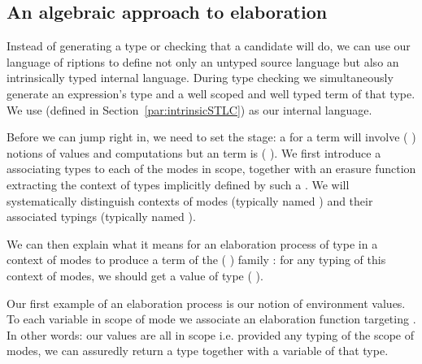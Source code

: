 \subsection{An algebraic approach to elaboration}\label{section:elaboration}

Instead of generating a type or checking that a candidate will do, we
can use our language of riptions to define not only an
untyped source language but also an intrinsically typed internal
language. During type checking we simultaneously generate an
expression's type and a well scoped and well typed term of that
type. We use  (defined in Section~\ref{par:intrinsicSTLC}) as
our internal language.

Before we can jump right in, we need to set the stage: a  for a
 term will involve ({ }) notions of values and
computations but an  term is ({ }). We first
introduce a  associating types to each of the modes in scope,
together with an erasure function  extracting the context of types
implicitly defined by such a .
We will systematically distinguish contexts of modes (typically named )
and their associated typings (typically named ).

\noindent
\begin{minipage}{\textwidth}
\begin{minipage}[t]{0.4\textwidth}
\end{minipage}
\begin{minipage}[t]{0.5\textwidth}
\end{minipage}
\end{minipage}

We can then explain what it means for an elaboration process of type 
in a context of modes  to produce a term of the
({ }) family : for any typing  of this
context of modes, we should get a value of type
{(    )}.

\begin{agdasnippet}
\end{agdasnippet}

Our first example of an elaboration process is our notion of environment values.
To each variable in scope of mode  we associate an elaboration function
targeting . In other words: our values are all in scope i.e. provided any
typing of the scope of modes, we can assuredly return a type together with a
variable of that type.

